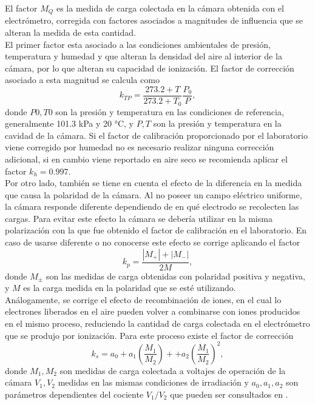 El factor $M_{Q}$ es la medida de carga colectada en la cámara obtenida con el electrómetro, corregida con factores asociados a  magnitudes de influencia que se alteran la medida de esta cantidad.\\

El primer factor esta asociado a las condiciones ambientales de presión, temperatura y humedad y que alteran la densidad del aire al interior de la cámara, por lo que alteran su capacidad de ionización. El factor de corrección asociado a esta magnitud se calcula como 
\begin{equation}
	k_{TP}=\frac{273.2+T}{273.2+T_0}\frac{P_0}{P},
\end{equation}
donde $P0,T0$ son la presión y temperatura en las condiciones de referencia, generalmente 101.3 kPa y 20 °C, y $P,T$ son la presión y temperatura en la cavidad de la cámara. Si el factor de calibración proporcionado por el laboratorio viene corregido por humedad no es necesario realizar ninguna corrección adicional, si en cambio viene reportado en aire seco se recomienda aplicar el factor $k_{h}=0.997$.\\

Por otro lado, también se tiene en cuenta el efecto de la diferencia en la medida que causa la polaridad de la cámara. Al no poseer un campo eléctrico uniforme, la cámara responde diferente dependiendo de en qué electrodo se recolecten las cargas. Para evitar este efecto la cámara se debería utilizar en la misma polarización con la que fue obtenido el factor de calibración en el laboratorio. En caso de usarse diferente o no conocerse este efecto se corrige aplicando el factor
\begin{equation}
	k_{p}=\frac{|M_{+}|+|M_{-}|}{2M},
\end{equation}
donde $M_{\pm}$ son las medidas de carga obtenidas con polaridad positiva y negativa, y $M$ es la carga medida en la polaridad que se esté utilizando.\\

Análogamente, se corrige el efecto de recombinación de iones, en el cual lo electrones liberados en el aire pueden volver a combinarse con iones producidos en el mismo proceso, reduciendo la cantidad de carga colectada en el electrómetro que se produjo por ionización. Para este proceso existe el factor de corrección
\begin{equation}
	k_s=a_0+a_1\left(\frac{M_1}{M_2}\right)++a_2\left(\frac{M_1}{M_2}\right)^2,
\end{equation}  
donde $M_1,M_2$ son medidas de carga colectada a voltajes de operación de la cámara  $V_1,V_2$ medidas en las mismas condiciones de irradiación y $a_0,a_1,a_2$ son parámetros dependientes del cociente $V_1/V_2$ que pueden ser consultados en \cite{TPR398}.\\

